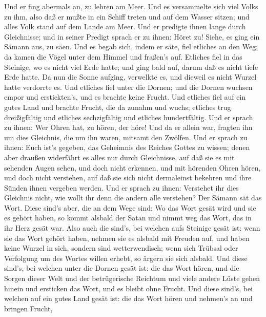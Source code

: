  Und er fing abermals an, zu lehren am Meer. Und es
versammelte sich viel Volks zu ihm, also daß er mußte in ein Schiff
treten und auf dem Wasser sitzen; und alles Volk stand auf dem Lande am
Meer.  Und er predigte ihnen lange durch Gleichnisse; und in
seiner Predigt sprach er zu ihnen:  Höret zu! Siehe, es ging
ein Sämann aus, zu säen.  Und es begab sich, indem er säte,
fiel etliches an den Weg; da kamen die Vögel unter dem Himmel und
fraßen's auf.  Etliches fiel in das Steinige, wo es nicht
viel Erde hatte; und ging bald auf, darum daß es nicht tiefe Erde hatte.
 Da nun die Sonne aufging, verwelkte es, und dieweil es
nicht Wurzel hatte verdorrte es.  Und etliches fiel unter
die Dornen; und die Dornen wuchsen empor und erstickten's, und es
brachte keine Frucht.  Und etliches fiel auf ein gutes Land
und brachte Frucht, die da zunahm und wuchs; etliches trug dreißigfältig
und etliches sechzigfältig und etliches hundertfältig.  Und
er sprach zu ihnen: Wer Ohren hat, zu hören, der höre!  Und
da er allein war, fragten ihn um dies Gleichnis, die um ihn waren,
mitsamt den Zwölfen.  Und er sprach zu ihnen: Euch ist's
gegeben, das Geheimnis des Reiches Gottes zu wissen; denen aber draußen
widerfährt es alles nur durch Gleichnisse,  auf daß sie es
mit sehenden Augen sehen, und doch nicht erkennen, und mit hörenden
Ohren hören, und doch nicht verstehen, auf daß sie sich nicht
dermaleinst bekehren und ihre Sünden ihnen vergeben werden.
 Und er sprach zu ihnen: Verstehet ihr dies Gleichnis
nicht, wie wollt ihr denn die andern alle verstehen?  Der
Sämann sät das Wort.  Diese sind's aber, die an dem Wege
sind: Wo das Wort gesät wird und sie es gehört haben, so kommt alsbald
der Satan und nimmt weg das Wort, das in ihr Herz gesät war.
 Also auch die sind's, bei welchen aufs Steinige gesät ist:
wenn sie das Wort gehört haben, nehmen sie es alsbald mit Freuden auf,
 und haben keine Wurzel in sich, sondern sind
wetterwendisch; wenn sich Trübsal oder Verfolgung um des Wortes willen
erhebt, so ärgern sie sich alsbald.  Und diese sind's, bei
welchen unter die Dornen gesät ist: die das Wort hören, 
und die Sorgen dieser Welt und der betrügerische Reichtum und viele
andere Lüste gehen hinein und ersticken das Wort, und es bleibt ohne
Frucht.  Und diese sind's, bei welchen auf ein gutes Land
gesät ist: die das Wort hören und nehmen's an und bringen Frucht,
